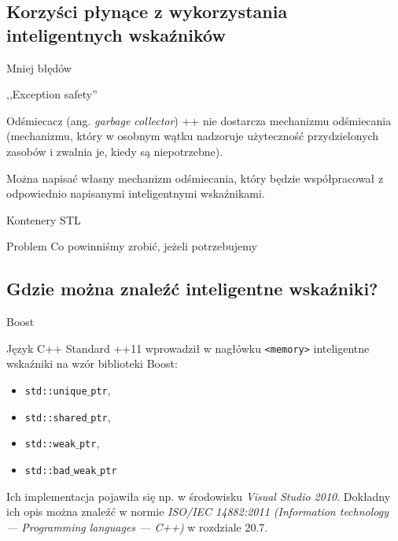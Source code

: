 \subsection{Korzyści płynące z wykorzystania inteligentnych wskaźników}

\begin{frame}{Mniej błędów}
\end{frame}

\begin{frame}{,,Exception safety''}
\end{frame}

\begin{frame}{Odśmiecacz (ang. \textit{garbage collector})}
  \C++ nie dostarcza mechanizmu odśmiecania (mechanizmu, który w osobnym wątku
  nadzoruje użyteczność przydzielonych zasobów i zwalnia je, 
  kiedy są niepotrzebne). \pause
  
  Można napisać własny mechanizm odśmiecania, który będzie współpracował
  z odpowiednio napisanymi inteligentnymi wskaźnikami.
\end{frame}

\begin{frame}{Kontenery STL}  
  \begin{minipage}[t][.75\textheight]{\textwidth}
    \begin{block}{Problem}
      Co powinniśmy zrobić, jeżeli potrzebujemy
    \end{block}	
  \end{minipage}
\end{frame}


\subsection{Gdzie można znaleźć inteligentne wskaźniki?}
\begin{frame}{Boost}
  
\end{frame}

\begin{frame}{Język  C++}
  Standard \C++11 wprowadził w nagłówku \texttt{<memory>}
  inteligentne wskaźniki na wzór biblioteki Boost: 
  \begin{itemize}
    \pause
  \item \texttt{std::unique$\_$ptr}, 
    \pause
  \item \texttt{std::shared$\_$ptr},
    \pause
  \item \texttt{std::weak$\_$ptr},
    \pause
  \item \texttt{std::bad$\_$weak$\_$ptr}
  \end{itemize}\pause
  Ich implementacja pojawiła się np. w środowisku 
  \textit{Visual Studio 2010}.	\pause
  Dokładny ich opis można znaleźć w normie
  \textit{ISO/IEC 14882:2011 (Information technology — Programming
    languages --- C++)} w rozdziale 20.7. 
\end{frame}


